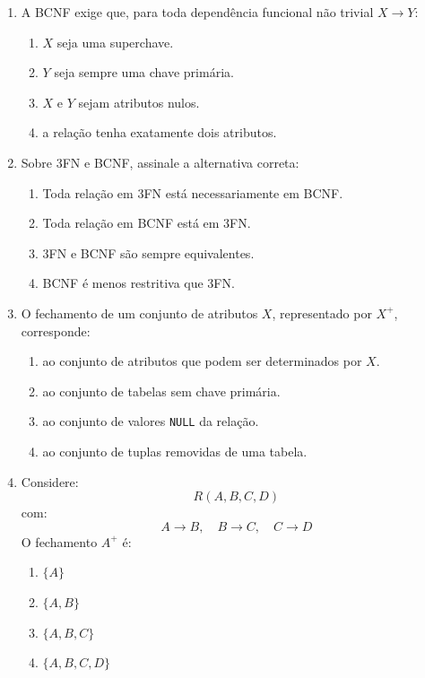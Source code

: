 \documentclass[12pt,a4paper]{article}
\begin{document}
\begin{enumerate}[label=\textbf{Q\arabic*.}]
\item A BCNF exige que, para toda dependência funcional não trivial $X \rightarrow Y$:

\begin{enumerate}[label=\alph*)]
    \item $X$ seja uma superchave.
    \item $Y$ seja sempre uma chave primária.
    \item $X$ e $Y$ sejam atributos nulos.
    \item a relação tenha exatamente dois atributos.
\end{enumerate}

\item Sobre 3FN e BCNF, assinale a alternativa correta:

\begin{enumerate}[label=\alph*)]
    \item Toda relação em 3FN está necessariamente em BCNF.
    \item Toda relação em BCNF está em 3FN.
    \item 3FN e BCNF são sempre equivalentes.
    \item BCNF é menos restritiva que 3FN.
\end{enumerate}

\item O fechamento de um conjunto de atributos $X$, representado por $X^+$, corresponde:

\begin{enumerate}[label=\alph*)]
    \item ao conjunto de atributos que podem ser determinados por $X$.
    \item ao conjunto de tabelas sem chave primária.
    \item ao conjunto de valores \texttt{NULL} da relação.
    \item ao conjunto de tuplas removidas de uma tabela.
\end{enumerate}

\item Considere:
\[
R(A,B,C,D)
\]
com:
\[
A \rightarrow B,\quad B \rightarrow C,\quad C \rightarrow D
\]
O fechamento $A^+$ é:

\begin{enumerate}[label=\alph*)]
    \item $\{A\}$
    \item $\{A,B\}$
    \item $\{A,B,C\}$
    \item $\{A,B,C,D\}$
\end{enumerate}


\end{enumerate}
\end{document}
